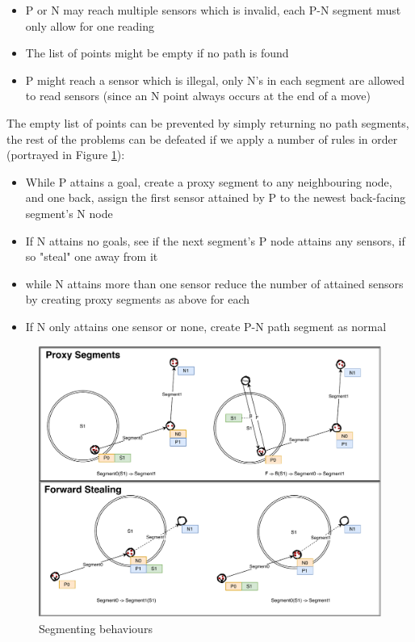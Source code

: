 \documentclass[10pt,a4paper]{article}
\begin{document}
\begin{itemize}
    \item P or N may reach multiple sensors which is invalid, each P-N segment must only allow for one reading
    \item The list of points might be empty if no path is found
    \item P might reach a sensor which is illegal, only N's in each segment are allowed to read sensors (since an N point always occurs at the end of a move)
\end{itemize}

\noindent The empty list of points can be prevented by simply returning no path segments, 
the rest of the problems can be defeated if we apply a number of rules in order (portrayed in Figure \ref{fig:segmenting}):
\begin{itemize}
    \item While P attains a goal, create a proxy segment to any neighbouring node, and one back, assign the first sensor attained by P 
        to the newest back-facing segment's N node
    \item If N attains no goals, see if the next segment's P node attains any sensors, if so "steal" one away from it
    \item while N attains more than one sensor reduce the number of attained sensors by creating proxy segments as above for each
    \item If N only attains one sensor or none, create P-N path segment as normal
\end{itemize}

\begin{figure}[H]
    \centering
    \includegraphics[width=0.7\columnwidth]{diagrams/diagram.pdf}
    \caption{Segmenting behaviours}
    \label{fig:segmenting}
\end{figure}
\end{document}
